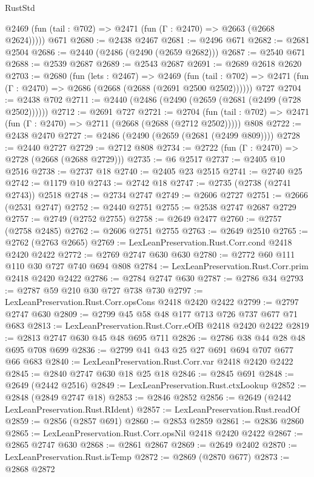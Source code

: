 \begin{lexlean}{RustStd}
\begin{coremodule}
      @2469 (fun (tail : @702) => @2471 (fun (Γ : @2470) => @2663 (@2668 @2624)))))
    @671
@2680 := @2438 @2467
@2681 := @2496 @671
@2682 := @2681 @2504
@2686 := @2440 (@2486 (@2490 (@2659 @2682)))
@2687 := @2540 @671
@2688 := @2539 @2687
@2689 := @2543 @2687
@2691 := @2689 @2618 @2620
@2703 := @2680
    (fun (lets : @2467) =>
    @2469
      (fun (tail : @702) => @2471 (fun (Γ : @2470) => @2686 (@2668 (@2688 (@2691 @2500 @2502))))))
    @727
@2704 := @2438 @702
@2711 := @2440 (@2486 (@2490 (@2659 (@2681 (@2499 (@728 @2502))))))
@2712 := @2691 @727
@2721 := @2704
    (fun (tail : @702) => @2471 (fun (Γ : @2470) => @2711 (@2668 (@2688 (@2712 @2502)))))
    @808
@2722 := @2438 @2470
@2727 := @2486 (@2490 (@2659 (@2681 (@2499 @809))))
@2728 := @2440 @2727
@2729 := @2712 @808
@2734 := @2722 (fun (Γ : @2470) => @2728 (@2668 (@2688 @2729)))
@2735 := @6 @2517
@2737 := @2405 @10 @2516
@2738 := @2737 @18
@2740 := @2405 @23 @2515
@2741 := @2740 @25
@2742 := @1179 @10
@2743 := @2742 @18
@2747 := @2735 (@2738 (@2741 @2743)) @2518
@2748 := @2734 @2747
@2749 := @2606 @2727
@2751 := @2666 (@2531 @2747)
@2752 := @2440 @2751
@2755 := @2538 @2747 @2687 @2729
@2757 := @2749 (@2752 @2755)
@2758 := @2649 @2477
@2760 := @2757 (@2758 @2485)
@2762 := @2606 @2751 @2755
@2763 := @2649 @2510
@2765 := @2762 (@2763 @2665)
@2769 := LexLeanPreservation.Rust.Corr.cond @2418 @2420 @2422
@2772 := @2769 @2747 @630 @630
@2780 := @2772 @60 @111 @110 @30 @727 @740 @694 @808
@2784 := LexLeanPreservation.Rust.Corr.prim @2418 @2420 @2422
@2786 := @2784 @2747 @630
@2787 := @2786 @34
@2793 := @2787 @59 @210 @30 @727 @738 @730
@2797 := LexLeanPreservation.Rust.Corr.opsCons @2418 @2420 @2422
@2799 := @2797 @2747 @630
@2809 := @2799 @45 @58 @48 @177 @713 @726 @737 @677 @71 @683
@2813 := LexLeanPreservation.Rust.Corr.eOfB @2418 @2420 @2422
@2819 := @2813 @2747 @630 @45 @48 @695 @711
@2826 := @2786 @38 @44 @28 @48 @695 @708 @699
@2836 := @2799 @41 @43 @25 @27 @691 @694 @707 @677 @66 @683
@2840 := LexLeanPreservation.Rust.Corr.var @2418 @2420 @2422
@2845 := @2840 @2747 @630 @18 @25 @18
@2846 := @2845 @691
@2848 := @2649 (@2442 @2516)
@2849 := LexLeanPreservation.Rust.ctxLookup
@2852 := @2848 (@2849 @2747 @18)
@2853 := @2846 @2852
@2856 := @2649 (@2442 LexLeanPreservation.Rust.RIdent)
@2857 := LexLeanPreservation.Rust.readOf
@2859 := @2856 (@2857 @691)
@2860 := @2853 @2859
@2861 := @2836 @2860
@2865 := LexLeanPreservation.Rust.Corr.opsNil @2418 @2420 @2422
@2867 := @2865 @2747 @630
@2868 := @2861 @2867
@2869 := @2649 @2402
@2870 := LexLeanPreservation.Rust.isTemp
@2872 := @2869 (@2870 @677)
@2873 := @2868 @2872

\end{coremodule}
\end{lexlean}
